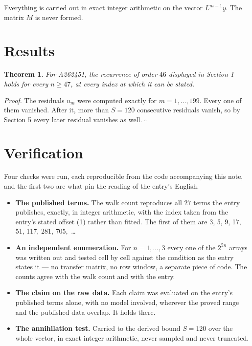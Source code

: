 \documentclass[11pt]{article}
\newtheorem{theorem}{Theorem}
\theoremstyle{definition}
\begin{document}
Everything is carried out in exact integer arithmetic on the vector $L^{m-1}y$. The matrix $M$ is never formed.

\section{Results}

\begin{theorem} For A262451, the recurrence of order $46$ displayed in Section 1 holds for every $n \ge 47$, at every index at which it can be stated.\end{theorem}

{\itshape Proof.} The residuals $u_m$ were computed exactly for $m = 1,\dots,199$. Every one of them vanished. After it, more than $S = 120$ consecutive residuals vanish, so by Section 5 every later residual vanishes as well. $\square$

\section{Verification}

Four checks were run, each reproducible from the code accompanying this note, and the first two are what pin the reading of the entry's English.

\begin{itemize}

\item {\bfseries The published terms.} The walk count reproduces all 27 terms the entry publishes, exactly, in integer arithmetic, with the index taken from the entry's stated offset (1) rather than fitted. The first of them are 3, 5, 9, 17, 51, 117, 281, 705,~\dots

\item {\bfseries An independent enumeration.} For $n = 1,\dots,3$ every one of the $2^{5n}$ arrays was written out and tested cell by cell against the condition as the entry states it --- no transfer matrix, no row window, a separate piece of code. The counts agree with the walk count and with the entry.

\item {\bfseries The claim on the raw data.} Each claim was evaluated on the entry's published terms alone, with no model involved, wherever the proved range and the published data overlap. It holds there.

\item {\bfseries The annihilation test.} Carried to the derived bound $S = 120$ over the whole vector, in exact integer arithmetic, never sampled and never truncated.

\end{itemize}
\end{document}
